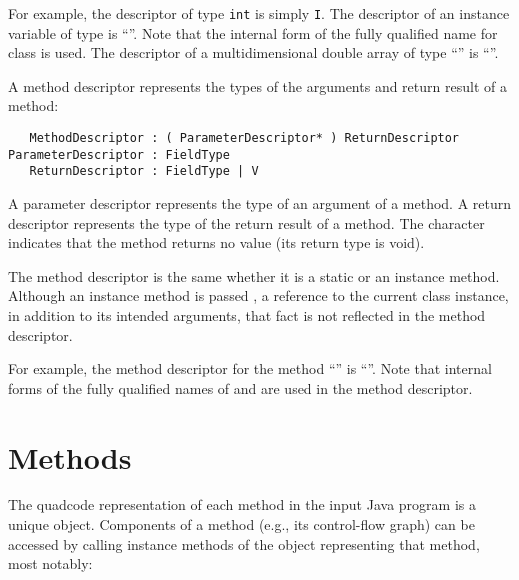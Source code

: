 For example, the descriptor of type {\tt int}
 is simply {\tt I}.  The descriptor of an instance variable of
 type  is ``''.  Note that the
 internal form of the fully qualified name for class  is
 used. The descriptor of a multidimensional double array of type
 ``'' is ``\code{[[[D}''.

A method descriptor represents the types of the arguments and 
return result of a method:

\begin{framed}
\begin{verbatim}
   MethodDescriptor : ( ParameterDescriptor* ) ReturnDescriptor
ParameterDescriptor : FieldType
   ReturnDescriptor : FieldType | V
\end{verbatim}
\end{framed}

A parameter descriptor represents the type of an argument of a method.
A return descriptor represents the type of the return result of a
method.  The character  indicates that the method returns no
value (its return type is void).

The method descriptor is the same whether it is a static or an instance
method.  Although an instance method is passed , a reference
to the current class instance, in addition to its intended arguments,
that fact is not reflected in the method descriptor.

For example, the method descriptor
for the method ``'' is
``''.  Note that
internal forms of the fully qualified names of  and
 are used in the method descriptor.

\section{Methods}

The quadcode representation of each method in the input Java program
is a unique  object.  Components of a method (e.g.,
its control-flow graph) can be accessed by calling instance methods of
the  object representing that method, most notably:

